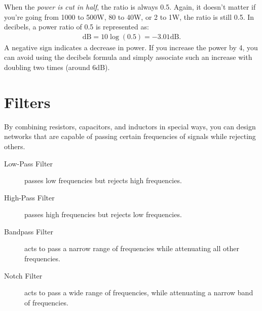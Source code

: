 \documentclass[../../document]{subfiles}
\begin{document}
When the \emph{power is cut in half}, the ratio is always 0.5. Again, it
doesn’t matter if you’re going from 1000 to 500\unit{\watt}, 80 to
40\unit{\watt}, or 2 to 1\unit{\watt}, the ratio is still 0.5. In decibels, a
power ratio of 0.5 is represented as:
\begin{gather}
	\unit{\deci\bel} = 10\log\left(0.5\right) = -3.01\unit{\deci\bel}.
\end{gather}
A negative sign indicates a decrease in power. If you increase the power by 4,
you can avoid using the decibels formula and simply associate such an increase
with doubling two times (around 6\unit{\deci\bel}).
\cite{practical_electronics}

\section{Filters}
By combining resistors, capacitors, and inductors in special ways, you can
design networks that are capable of passing certain frequencies of signals
while rejecting others. \cite[sec. 2.23]{practical_electronics}
\begin{description}
	\item[Low-Pass Filter] passes low frequencies but rejects high frequencies.
	\item[High-Pass Filter] passes high frequencies but rejects low frequencies.
	\item[Bandpass Filter] acts to pass a narrow range of frequencies while
		attenuating all other frequencies.
	\item[Notch Filter] acts to pass a wide range of frequencies, while
		attenuating a narrow band of frequencies.
\end{description}
\end{document}
